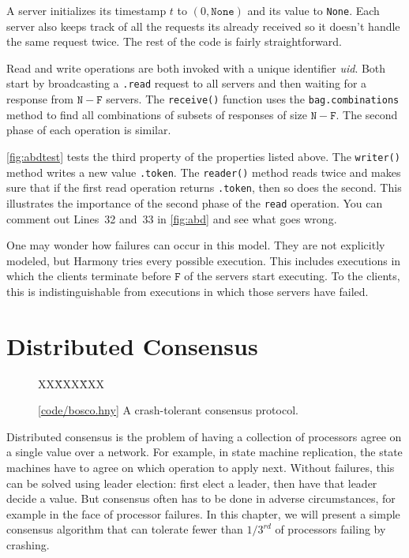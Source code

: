 \documentclass{report}
\newcommand{\harmonysource}[1]{
\begin{tabbing}
XX\=XXX\=XXX\kill
    
\end{tabbing}
}
\newcommand{\harmonylink}[1]{%
[\href{https://harmony.cs.cornell.edu/#1}{\underline{#1}}]%
}
\newenvironment{code}{
\tcolorbox
}{
\endtcolorbox
}
\begin{document}
A server initializes its timestamp $t$ to
$(0, \mathtt{None})$ and its value to \texttt{None}.
Each server also keeps track of all the requests its already received
so it doesn't handle the same request twice.
The rest of the code is fairly straightforward.

Read and write operations are both invoked with a unique identifier
\textit{uid}.  Both start by broadcasting a \texttt{.read}
request to all servers and then waiting for a response from
$\mathtt{N} - \mathtt{F}$ servers.
The \texttt{receive()} function uses the \texttt{bag.combinations} method
to find all combinations of subsets of responses of size
$\mathtt{N} - \mathtt{F}$.
The second phase of each operation is similar.

\autoref{fig:abdtest} tests the third property of the properties listed
above.  The \texttt{writer()} method writes a new value \texttt{.token}.
The \texttt{reader()} method reads twice and makes sure that if the
first read operation returns \texttt{.token}, then so does the second.
This illustrates the importance of the second phase of the \texttt{read}
operation.  You can comment out Lines~32 and~33 in \autoref{fig:abd} and
see what goes wrong.

One may wonder how failures can occur in this model.  They are not
explicitly modeled, but Harmony tries every possible execution.
This includes executions in which the clients terminate before
$\texttt{F}$ of the servers start executing.  To the clients, this
is indistinguishable from executions in which those
servers have failed.

\chapter{Distributed Consensus}
\label{ch:consensus}

\begin{figure}
\begin{code}
\harmonysource{bosco}
\end{code}
\caption{\harmonylink{code/bosco.hny} A crash-tolerant consensus protocol.}
\label{fig:bosco}
\end{figure}

Distributed consensus is the problem of having a collection of processors agree
on a single value over a network.
For example, in state machine replication, the state machines have to agree
on which operation to apply next.
Without failures, this can be solved using leader election: first elect a leader, then have that leader decide a value.
But consensus often has to be done in adverse circumstances,
for example in the face of processor failures.
In this chapter, we will present a simple consensus algorithm that can tolerate
fewer than $1/3^{rd}$ of processors failing by crashing.
\end{document}
